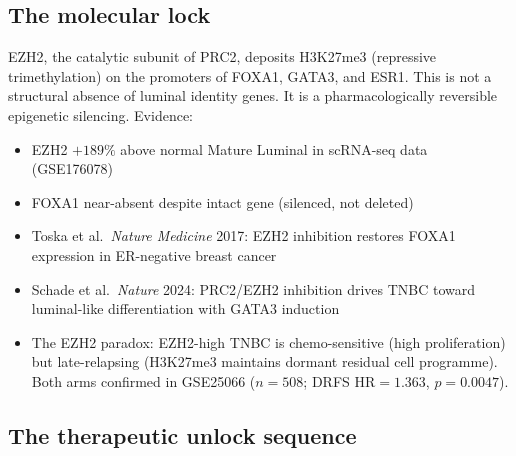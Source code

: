 \documentclass[12pt, a4paper]{article}
\begin{document}
\subsection{The molecular lock}

EZH2, the catalytic subunit of PRC2, deposits
H3K27me3 (repressive trimethylation) on the promoters
of FOXA1, GATA3, and ESR1. This is not a structural
absence of luminal identity genes. It is a
pharmacologically reversible epigenetic silencing.
Evidence:

\begin{itemize}[noitemsep]
  \item EZH2 $+189\%$ above normal Mature Luminal
        in scRNA-seq data (GSE176078)
  \item FOXA1 near-absent despite intact gene
        (silenced, not deleted)
  \item Toska et al.\ \textit{Nature Medicine} 2017:
        EZH2 inhibition restores FOXA1 expression in
        ER-negative breast cancer
  \item Schade et al.\ \textit{Nature} 2024:
        PRC2/EZH2 inhibition drives TNBC toward
        luminal-like differentiation with GATA3
        induction
  \item The EZH2 paradox: EZH2-high TNBC is
        chemo-sensitive (high proliferation) but
        late-relapsing (H3K27me3 maintains dormant
        residual cell programme). Both arms
        confirmed in GSE25066 ($n=508$; DRFS
        HR$=1.363$, $p=0.0047$).
\end{itemize}

\subsection{The therapeutic unlock sequence}
\end{document}
